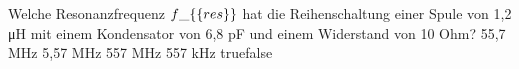     {Welche Resonanzfrequenz $f\_\{\textrm\{res\}\}$ hat die Reihenschaltung einer Spule von 1,2 μH mit einem Kondensator von 6,8 pF und einem Widerstand von 10 Ohm?}
    {55,7 MHz}
    {5,57 MHz}
    {557 MHz}
    {557 kHz}
    {true}{false}